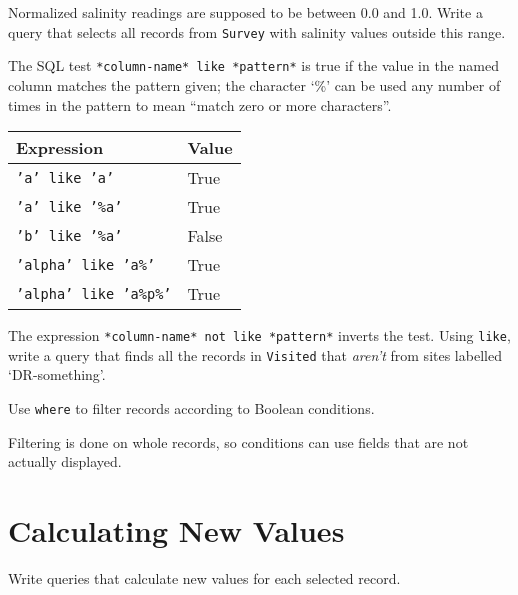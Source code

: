 \documentclass{book}
\begin{document}
\begin{challenge}
  Normalized salinity readings are supposed to be between 0.0 and 1.0.
  Write a query that selects all records from \texttt{Survey} with
  salinity values outside this range.
\end{challenge}

\begin{challenge}
  The SQL test \texttt{*column-name* like *pattern*} is true if the
  value in the named column matches the pattern given; the character
  `\%' can be used any number of times in the pattern to mean ``match
  zero or more characters''.

  \begin{tabular}{ll}
    Expression & Value
  \\
  \hline
  \texttt{'a' like 'a'} & True
  \\
  \texttt{'a' like '\%a'} & True
  \\
  \texttt{'b' like '\%a'} & False
  \\
  \texttt{'alpha' like 'a\%'} & True
  \\
  \texttt{'alpha' like 'a\%p\%'} & True
  \\
    \end{tabular}

  The expression \texttt{*column-name* not like *pattern*} inverts the
  test. Using \texttt{like}, write a query that finds all the records in
  \texttt{Visited} that \emph{aren't} from sites labelled
  `DR-something'.
\end{challenge}

\begin{keypoints}
\begin{swcitemize}
\item
  Use \texttt{where} to filter records according to Boolean conditions.
\item
  Filtering is done on whole records, so conditions can use fields that
  are not actually displayed.
\end{swcitemize}
\end{keypoints}

\section{Calculating New Values}

\begin{objectives}
\begin{swcitemize}
\item
  Write queries that calculate new values for each selected record.
\end{swcitemize}
\end{objectives}
\end{document}
